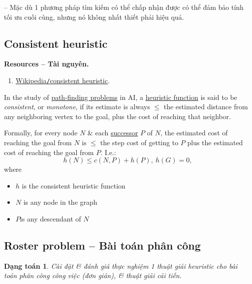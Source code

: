 \documentclass{article}
\newtheorem{dangtoan}{Dạng toán}
\begin{document}
-- Mặc dù 1 phương pháp tìm kiếm có thể chấp nhận được có thể đảm bảo tính tối ưu cuối cùng, nhưng nó không nhất thiết phải hiệu quả.


\subsection{Consistent heuristic}
\textbf{\textsf{Resources -- Tài nguyên.}}
\begin{enumerate}
	\item \href{https://en.wikipedia.org/wiki/Consistent_heuristic}{Wikipedia{\tt/}consistent heuristic}.
\end{enumerate}
In the study of \href{https://en.wikipedia.org/wiki/Shortest_path_problem}{path-finding problems} in AI, a \href{https://en.wikipedia.org/wiki/Heuristic_function}{heuristic function} is said to be {\it consistent}, or {\it monotone}, if its estimate is always $\le$ the estimated distance from any neighboring vertex to the goal, plus the cost of reaching that neighbor.

Formally, for every node $N$ \& each \href{https://en.wikipedia.org/wiki/Successor_(graph_theory)#Direction}{successor} $P$ of $N$, the estimated cost of reaching the goal from $N$ is $\le$ the step cost of getting to $P$ plus the estimated cost of reaching the goal from $P$. I.e.:
\begin{equation*}
	h(N)\le c(N,P) + h(P),\ h(G) = 0,
\end{equation*}
where
\begin{itemize}
	\item $h$ is the consistent heuristic function
	\item $N$ is any node in the graph
	\item $P$is any descendant of $N$
\end{itemize}


\subsection{Roster problem -- Bài toán phân công}

\begin{dangtoan}
	Cài đặt \& đánh giá thực nghiệm 1 thuật giải heuristic cho bài toán phân công công việc (đơn giản), \& thuật giải cải tiến.
\end{dangtoan}
\end{document}
